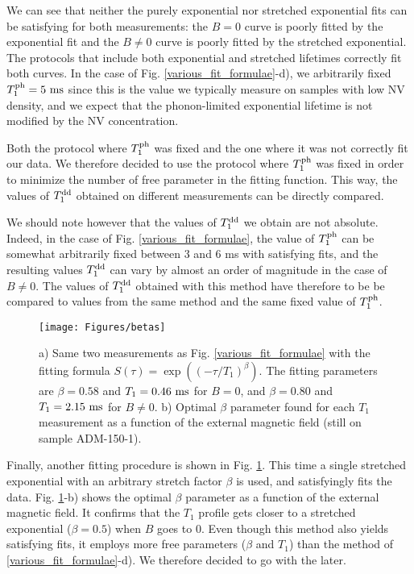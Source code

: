 \documentclass[a4paper,11pt]{report}
\begin{document}
We can see that neither the purely exponential nor stretched exponential fits can be satisfying for both measurements: the $B=0$ curve is poorly fitted by the exponential fit and the $B \neq 0$ curve is poorly fitted by the stretched exponential. The protocols that include both exponential and stretched lifetimes correctly fit both curves. In the case of Fig. \ref{various_fit_formulae}-d), we arbitrarily fixed $T_1^{\rm ph}=5\ \rm ms$ since this is the value we typically measure on samples with low NV density, and we expect that the phonon-limited exponential lifetime is not modified by the NV concentration.

Both the protocol where $T_1^{\rm ph}$ was fixed and the one where it was not correctly fit our data. We therefore decided to use the protocol where $T_1^{\rm ph}$ was fixed in order to minimize the number of free parameter in the fitting function. This way, the values of $T_1^{\rm dd}$ obtained on different measurements can be directly compared. 

We should note however that the values of $T_1^{\rm dd}$ we obtain are not absolute. Indeed, in the case of Fig. \ref{various_fit_formulae}, the value of $T_1^{\rm ph}$ can be somewhat arbitrarily fixed between 3 and 6 ms with satisfying fits, and the resulting values $T_1^{\rm dd}$ can vary by almost an order of magnitude in the case of $B\neq0$. The values of $T_1^{\rm dd}$ obtained with this method have therefore to be be compared to values from the same method and the same fixed value of $T_1^{\rm ph}$.

\begin{figure}[h]
\centering
\texttt{[image: Figures/betas]}
\caption{a) Same two measurements as Fig. \ref{various_fit_formulae} with the fitting formula $S(\tau)=\exp ((-\tau/T_1)^{\beta})$. The fitting parameters are $\beta=0.58$ and $T_1=0.46\ \rm ms$ for $B=0$, and $\beta=0.80$ and $T_1=2.15\ \rm ms$ for $B\neq0$. b) Optimal $\beta$ parameter found for each $T_1$ measurement as a function of the external magnetic field (still on sample ADM-150-1).}
\label{betas}
\end{figure}

Finally, another fitting procedure is shown in Fig. \ref{betas}. This time a single stretched exponential with an arbitrary stretch factor $\beta$ is used, and satisfyingly fits the data. Fig. \ref{betas}-b) shows the optimal $\beta$ parameter as a function of the external magnetic field. It confirms that the $T_1$ profile gets closer to a stretched exponential ($\beta=0.5$) when $B$ goes to 0. Even though this method also yields satisfying fits, it employs more free parameters ($\beta$ and $T_1$) than the method of \ref{various_fit_formulae}-d). We therefore decided to go with the later.
\end{document}
